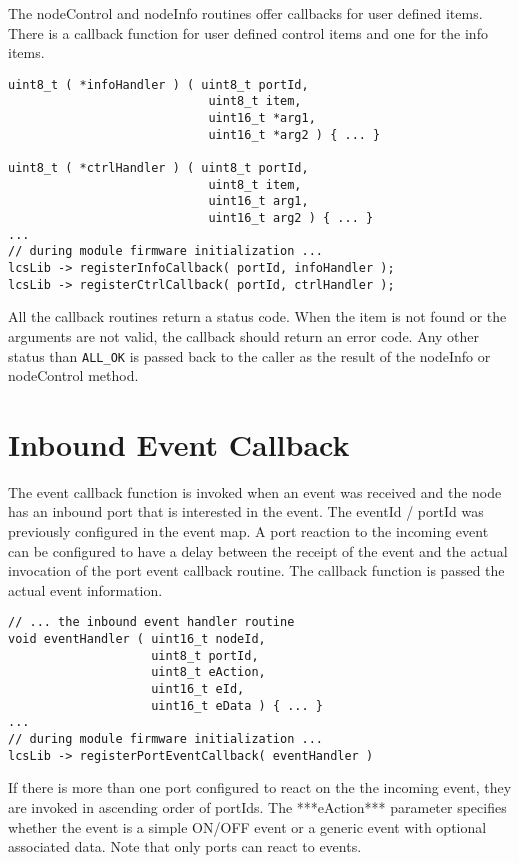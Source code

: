The nodeControl and nodeInfo routines offer callbacks for user defined items. There is a callback function for user defined control items and one for the info items.

\lstset{style=codesnippetstyle}
\begin{lstlisting}
uint8_t ( *infoHandler ) ( uint8_t portId, 
                            uint8_t item, 
                            uint16_t *arg1, 
                            uint16_t *arg2 ) { ... }

uint8_t ( *ctrlHandler ) ( uint8_t portId, 
                            uint8_t item, 
                            uint16_t arg1, 
                            uint16_t arg2 ) { ... }
...
// during module firmware initialization ...
lcsLib -> registerInfoCallback( portId, infoHandler );
lcsLib -> registerCtrlCallback( portId, ctrlHandler );
\end{lstlisting}

All the callback routines return a status code. When the item is not found or the arguments are not valid, the callback should return an error code. Any other status than \texttt{ALL\_OK} is passed back to the caller as the result of the nodeInfo or nodeControl method.

\section{Inbound Event Callback}

The event callback function is invoked when an event was received and the node has an inbound port that is interested in the event. The eventId / portId was previously configured in the event map. A port reaction to the incoming event can be configured to have a delay between the receipt of the event and the actual invocation of the port event callback routine. The callback function is passed the actual event information.

\lstset{style=codesnippetstyle}
\begin{lstlisting}
// ... the inbound event handler routine
void eventHandler ( uint16_t nodeId, 
                    uint8_t portId, 
                    uint8_t eAction,
                    uint16_t eId, 
                    uint16_t eData ) { ... }
...
// during module firmware initialization ...
lcsLib -> registerPortEventCallback( eventHandler )
\end{lstlisting}

If there is more than one port configured to react on the the incoming event, they are invoked in ascending order of portIds. The ***eAction*** parameter specifies whether the event is a simple ON/OFF event or a generic event with optional associated data. Note that only ports can react to events.

